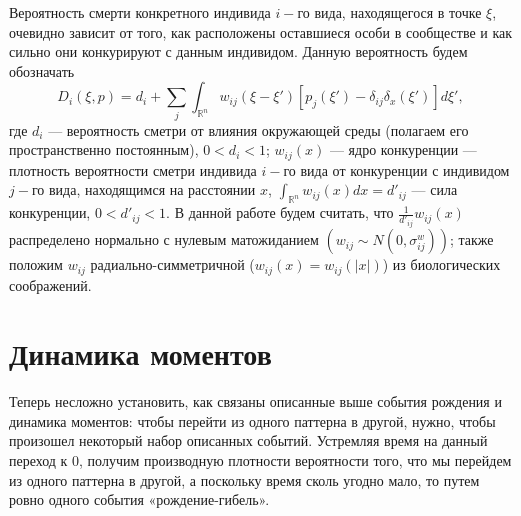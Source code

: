 Вероятность смерти конкретного индивида $ i- $го вида, находящегося в точке $ \xi $, очевидно зависит от того, как расположены оставшиеся особи в сообществе и как сильно они конкурируют с данным индивидом. Данную вероятность будем обозначать
\begin{equation*}
D_{i}(\xi,p)=d_{i}+\sum_{j}\int_{\mathbb{R}^{n}}w_{ij}\left(\xi-\xi'\right)\left[p_{j}(\xi')-\delta_{ij}\delta_{x}(\xi')\right]d\xi',
\end{equation*}
где $ d_{i} $ --- вероятность сметри от влияния окружающей среды (полагаем его пространственно постоянным), $ 0<d_{i}<1 $; $ w_{ij}(x) $ --- ядро конкуренции --- плотность вероятности сметри индивида $ i- $го вида от конкуренции с индивидом $ j- $го вида, находящимся на расстоянии $ x $, $ \int_{\mathbb{R}^{n}}w_{ij}(x)dx=d'_{ij} $ --- сила конкуренции, $ 0<d'_{ij}<1 $. В данной работе будем считать, что $ \frac{1}{d'_{ij}}w_{ij}(x) $ распределено нормально с нулевым матожиданием $ \left(w_{ij}\sim N(0,\sigma_{ij}^{w})\right) $; также положим $ w_{ij} $ радиально-симметричной ($ w_{ij}(x)=w_{ij}(|x|) $) из биологических соображений.

\section{Динамика моментов}

Теперь несложно установить, как связаны описанные выше события рождения и динамика моментов: чтобы перейти из одного паттерна в другой, нужно, чтобы произошел некоторый набор описанных событий. Устремляя время на данный переход к 0, получим производную плотности вероятности того, что мы перейдем из одного паттерна в другой, а поскольку время сколь угодно мало, то путем ровно одного события «рождение-гибель».


